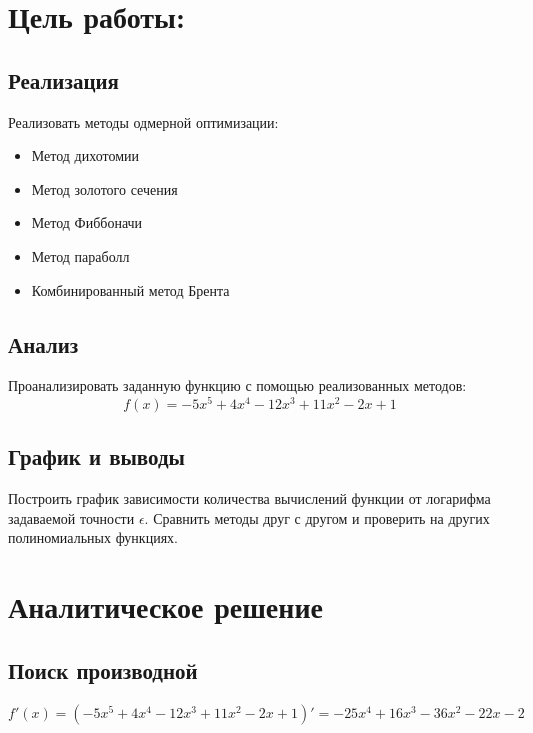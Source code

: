 \section{Цель работы:}
\subsection{Реализация}
Реализовать методы одмерной оптимизации:
\begin{itemize}
    \item Метод дихотомии
    \item Метод золотого сечения
    \item Метод Фиббоначи
    \item Метод параболл
    \item Комбинированный метод Брента
\end{itemize}

\subsection{Анализ}
Проанализировать заданную функцию с помощью реализованных методов:
\begin{equation*}
    f(x) = -5x^5+4x^4-12x^3+11x^2-2x+1    
\end{equation*}

\subsection{График и выводы}
Построить график зависимости количества вычислений функции от логарифма задаваемой точности $\epsilon$. Сравнить методы друг с другом и проверить на других полиномиальных функциях.


\section{Аналитическое решение}
\subsection{Поиск производной}
\centering
$f'(x) = (-5x^5+4x^4-12x^3+11x^2-2x+1)' = -25x^4+16x^3-36x^2-22x-2$
\flushleft
